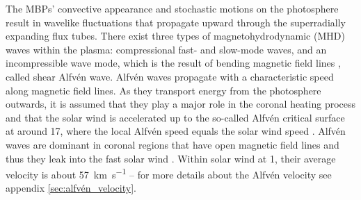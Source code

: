 \begin{figure}[htb]
\end{figure}

The MBPs' convective appearance and stochastic motions on the photosphere result in wavelike fluctuations that propagate upward through the superradially expanding flux tubes. There exist three types of magnetohydrodynamic (MHD) waves within the plasma: compressional fast- and slow-mode waves, and an incompressible wave mode, which is the result of bending magnetic field lines \citep{Alfven1942}, called shear Alfvén wave. Alfvén waves propagate with a characteristic speed along magnetic field lines. As they transport energy from the photosphere outwards, it is assumed that they play a major role in the coronal heating process and that the solar wind is accelerated up to the so-called Alfvén critical surface at around \SI{17}{\Rs}, where the local Alfvén speed equals the solar wind speed \citep{Sittler1999,Exarhos2000}. Alfvén waves are dominant in coronal regions that have open magnetic field lines and thus they leak into the fast solar wind \citep{Cranmer2005}. Within solar wind at \SI{1}{\au}, their average velocity is about \SI{57}{\km\per\s} \citep{Veselovsky2010} -- for more details about the Alfvén velocity see appendix \autoref{sec:alfvén_velocity}.

